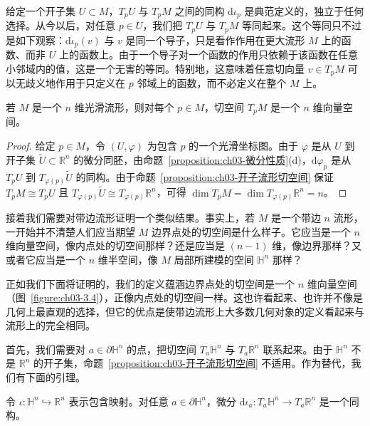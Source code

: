 \documentclass[../../main.tex]{subfiles}
\begin{document}
给定一个开子集 $U\subset M$，$T_{p}U$ 与 $T_{p}M$ 之间的同构 $\mathrm{d}\iota_{p}$ 是典范定义的，独立于任何选择。从今以后，对任意 $p\in U$，我们把 $T_{p}U$ 与 $T_{p}M$ 等同起来。这个等同只不过是如下观察：$\mathrm{d}\iota_{p}(v)$ 与 $v$ 是同一个导子，只是看作作用在更大流形 $M$ 上的函数、而非 $U$ 上的函数上。由于一个导子对一个函数的作用只依赖于该函数在任意小邻域内的值，这是一个无害的等同。特别地，这意味着任意切向量 $v\in T_{p}M$ 可以无歧义地作用于只定义在 $p$ 邻域上的函数，而不必定义在整个 $M$ 上。

\begin{proposition}[切空间的维数]\label{proposition:ch03-切空间维数}
若 $M$ 是一个 $n$ 维光滑流形，则对每个 $p\in M$，切空间 $T_{p}M$ 是一个 $n$ 维向量空间。
\end{proposition}

\begin{proof}
给定 $p\in M$，令 $(U,\varphi)$ 为包含 $p$ 的一个光滑坐标图。由于 $\varphi$ 是从 $U$ 到开子集 $\widetilde{U}\subset\mathbb{R}^{n}$ 的微分同胚，由命题~\cref{proposition:ch03-微分性质}(d)，$\mathrm{d}\varphi_{p}$ 是从 $T_{p}U$ 到 $T_{\varphi(p)}\widetilde{U}$ 的同构。由于命题~\cref{proposition:ch03-开子流形切空间} 保证 $T_{p}M\cong T_{p}U$ 且 $T_{\varphi(p)}\widetilde{U}\cong T_{\varphi(p)}\mathbb{R}^{n}$，可得 $\dim T_{p}M=\dim T_{\varphi(p)}\mathbb{R}^{n}=n$。
\end{proof}

接着我们需要对带边流形证明一个类似结果。事实上，若 $M$ 是一个带边 $n$ 流形，一开始并不清楚人们应当期望 $M$ 边界点处的切空间是什么样子。它应当是一个 $n$ 维向量空间，像内点处的切空间那样？还是应当是 $(n-1)$ 维，像边界那样？又或者它应当是一个 $n$ 维半空间，像 $M$ 局部所建模的空间 $\mathbb{H}^{n}$ 那样？

正如我们下面将证明的，我们的定义蕴涵边界点处的切空间是一个 $n$ 维向量空间（图~\cref{figure:ch03-3.4}），正像内点处的切空间一样。这也许看起来、也许并不像是几何上最直观的选择，但它的优点是使带边流形上大多数几何对象的定义看起来与流形上的完全相同。

首先，我们需要对 $a\in\partial\mathbb{H}^{n}$ 的点，把切空间 $T_{a}\mathbb{H}^{n}$ 与 $T_{a}\mathbb{R}^{n}$ 联系起来。由于 $\mathbb{H}^{n}$ 不是 $\mathbb{R}^{n}$ 的开子集，命题~\cref{proposition:ch03-开子流形切空间} 不适用。作为替代，我们有下面的引理。

\begin{lemma}\label{lemma:ch03-包含映射微分同构}
令 $\iota:\mathbb{H}^{n}\hookrightarrow\mathbb{R}^{n}$ 表示包含映射。对任意 $a\in\partial\mathbb{H}^{n}$，微分 $\mathrm{d}\iota_{a}:T_{a}\mathbb{H}^{n}\to T_{a}\mathbb{R}^{n}$ 是一个同构。
\end{lemma}
\end{document}
